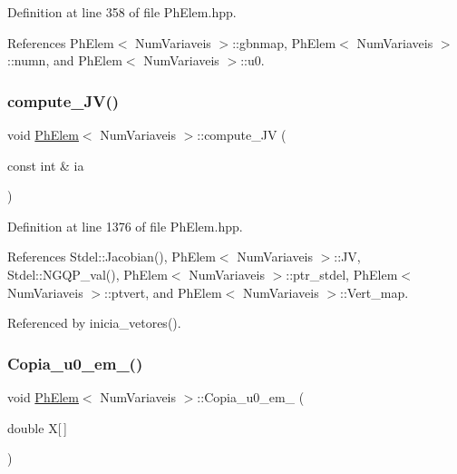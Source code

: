 Definition at line 358 of file Ph\+Elem.\+hpp.



References Ph\+Elem$<$ Num\+Variaveis $>$\+::gbnmap, Ph\+Elem$<$ Num\+Variaveis $>$\+::numn, and Ph\+Elem$<$ Num\+Variaveis $>$\+::u0.

\mbox{\label{classPhElem_abc4450898733d818edaa51a7f0d2bb58}} 
\subsubsection{\texorpdfstring{compute\+\_\+\+J\+V()}{compute\_JV()}}
{\footnotesize\ttfamily void \hyperlink{classPhElem}{Ph\+Elem}$<$ Num\+Variaveis $>$\+::compute\+\_\+\+JV (\begin{DoxyParamCaption}\item[{const int \&}]{ia }\end{DoxyParamCaption})\hspace{0.3cm}{\ttfamily [inherited]}}



Definition at line 1376 of file Ph\+Elem.\+hpp.



References Stdel\+::\+Jacobian(), Ph\+Elem$<$ Num\+Variaveis $>$\+::\+JV, Stdel\+::\+N\+G\+Q\+P\+\_\+val(), Ph\+Elem$<$ Num\+Variaveis $>$\+::ptr\+\_\+stdel, Ph\+Elem$<$ Num\+Variaveis $>$\+::ptvert, and Ph\+Elem$<$ Num\+Variaveis $>$\+::\+Vert\+\_\+map.



Referenced by inicia\+\_\+vetores().

\mbox{\label{classPhElem_ac395c07742ced41887c4c12019454618}} 
\subsubsection{\texorpdfstring{Copia\+\_\+u0\+\_\+em\+\_\+()}{Copia\_u0\_em\_()}\hspace{0.1cm}{\footnotesize\ttfamily [1/2]}}
{\footnotesize\ttfamily void \hyperlink{classPhElem}{Ph\+Elem}$<$ Num\+Variaveis $>$\+::Copia\+\_\+u0\+\_\+em\+\_\+ (\begin{DoxyParamCaption}\item[{double}]{X\mbox{[}$\,$\mbox{]} }\end{DoxyParamCaption})\hspace{0.3cm}{\ttfamily [inherited]}}



